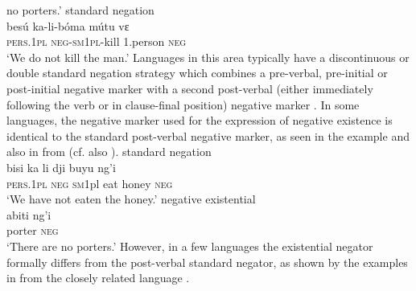 \documentclass[output=paper]{langsci/langscibook}
\begin{document}
no porters.' \ex\label{ex:duma-kill} standard negation
\citep[144]{Mickala1988}\\ \gll bes{\'u} ka-li-b{\'o}ma m{\'u}tu vɛ\\
\textsc{pers.1pl} \textsc{neg-sm1pl}-kill 1.person \textsc{neg}\\ \glt 	`We
do not kill the man.' \z\z 
%
Languages in this area typically have a
discontinuous or double standard negation strategy which combines a
pre-verbal, pre-initial or post-initial negative marker with a second
post-verbal (either immediately following the verb or in clause-final
position) negative marker \citep{DevosAuwera2013}. In some languages, the
negative marker used for the expression of negative existence is identical
to the standard post-verbal negative marker, as seen in the 
example  and also in
 from  (cf. also
).  \ea\label{ex:nduumo-honey-porter}
 \ea standard
negation\\ \gll bisi ka li dji buyu ng'i\\ \textsc{pers.1pl} \textsc{neg}
\textsc{sm1}pl eat honey \textsc{neg}\\ \glt `We have not eaten the honey.'
\ex negative existential\\ \gll abiti ng'i\\ porter \textsc{neg}\\ \glt
`There are no porters.' \z\z However, in a few languages the existential
negator formally differs from the post-verbal standard negator, as shown by
the examples in  from the closely related
language .
\end{document}

